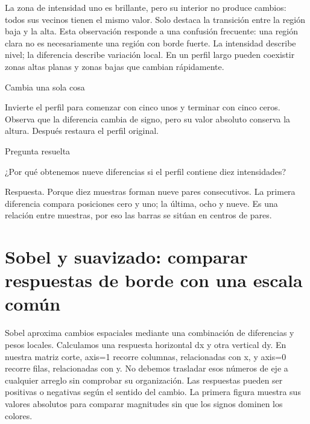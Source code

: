 

La zona de intensidad uno es brillante, pero su interior no produce cambios: todos sus vecinos tienen el mismo valor. Solo destaca la transición entre la región baja y la alta. Esta observación responde a una confusión frecuente: una región clara no es necesariamente una región con borde fuerte. La intensidad describe nivel; la diferencia describe variación local. En un perfil largo pueden coexistir zonas altas planas y zonas bajas que cambian rápidamente.



\begin{Practica}{Cambia una sola cosa}

Invierte el perfil para comenzar con cinco unos y terminar con cinco ceros. Observa que la diferencia cambia de signo, pero su valor absoluto conserva la altura. Después restaura el perfil original.


\end{Practica}


\begin{Idea}{Pregunta resuelta}

¿Por qué obtenemos nueve diferencias si el perfil contiene diez intensidades?


Respuesta. Porque diez muestras forman nueve pares consecutivos. La primera diferencia compara posiciones cero y uno; la última, ocho y nueve. Es una relación entre muestras, por eso las barras se sitúan en centros de pares.


\end{Idea}

\clearpage

\section{Sobel y suavizado: comparar respuestas de borde con una escala común}


Sobel aproxima cambios espaciales mediante una combinación de diferencias y pesos locales. Calculamos una respuesta horizontal dx y otra vertical dy. En nuestra matriz corte, axis=1 recorre columnas, relacionadas con x, y axis=0 recorre filas, relacionadas con y. No debemos trasladar esos números de eje a cualquier arreglo sin comprobar su organización. Las respuestas pueden ser positivas o negativas según el sentido del cambio. La primera figura muestra sus valores absolutos para comparar magnitudes sin que los signos dominen los colores.


